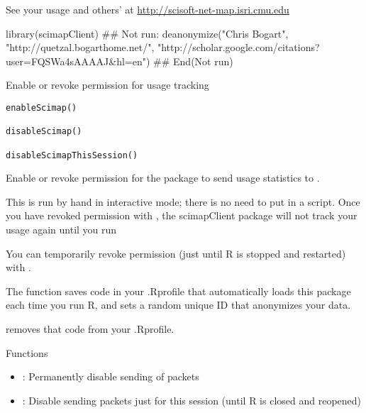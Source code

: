 \documentclass[letterpaper]{book}
\begin{document}
%
\begin{References}\relax
See your usage and others' at \url{http://scisoft-net-map.isri.cmu.edu}
\end{References}
%
\begin{SeeAlso}\relax
{}
\end{SeeAlso}
%
\begin{Examples}
\begin{ExampleCode}
library(scimapClient)
## Not run: deanonymize("Chris Bogart", "http://quetzal.bogarthome.net/",
    "http://scholar.google.com/citations?user=FQSWa4sAAAAJ&hl=en")
## End(Not run)
\end{ExampleCode}
\end{Examples}
%
\begin{Description}\relax
Enable or revoke permission for usage tracking
\end{Description}
%
\begin{Usage}
\begin{verbatim}
enableScimap()

disableScimap()

disableScimapThisSession()
\end{verbatim}
\end{Usage}
%
\begin{Details}\relax
Enable or revoke permission for the package to
send usage statistics to .

This is run by hand in interactive mode; there is no
need to put in a script.  Once you have revoked permission with ,
the scimapClient package will not track your usage again
until you run 

You can temporarily revoke permission (just until R is stopped and restarted)
with .

The  function saves code in your .Rprofile that
automatically loads this package each time you run R, and sets a random unique
ID that anonymizes your data.

 removes that code from your .Rprofile.
\end{Details}
%
\begin{Section}{Functions}
\begin{itemize}

\item \code{}: Permanently disable sending of packets

\item \code{}: Disable sending packets just for this session (until R is closed and reopened)

\end{itemize}
\end{Section}
\end{document}
